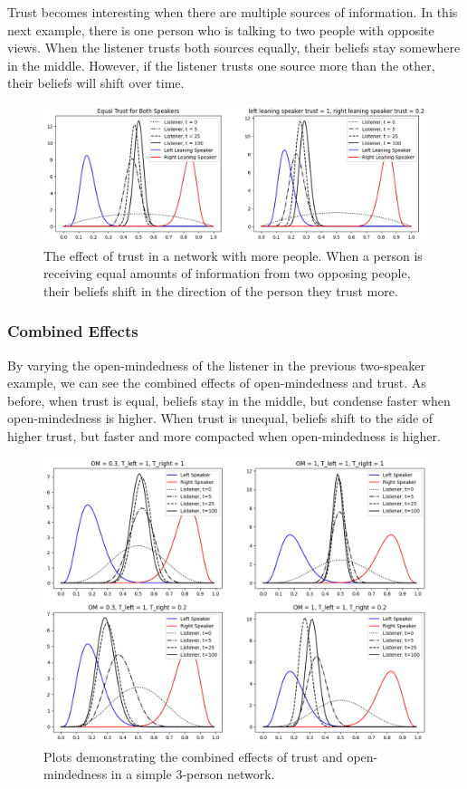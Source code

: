 \documentclass[11pt]{article}
\begin{document}
Trust becomes interesting when there are multiple sources of information. In this next example, there is one person who is talking to two people with opposite views. When the listener trusts both sources equally, their beliefs stay somewhere in the middle. However, if the listener trusts one source more than the other, their beliefs will shift over time.

\begin{figure}[h]
    \centering
    \includegraphics[scale=0.5]{images/trust_two_sources.png}
    \caption{The effect of trust in a network with more people. When a person is receiving equal amounts of information from two opposing people, their beliefs shift in the direction of the person they trust more.}
\end{figure}

\newpage

\subsubsection{Combined Effects}

By varying the open-mindedness of the listener in the previous two-speaker example, we can see the combined effects of open-mindedness and trust. As before, when trust is equal, beliefs stay in the middle, but condense faster when open-mindedness is higher. When trust is unequal, beliefs shift to the side of higher trust, but faster and more compacted when open-mindedness is higher.

\begin{figure}[h]
    \centering
    \includegraphics[scale=0.5]{images/trust_and_OM_example.png}
    \caption{Plots demonstrating the combined effects of trust and open-mindedness in a simple 3-person network.}
\end{figure}
\end{document}
